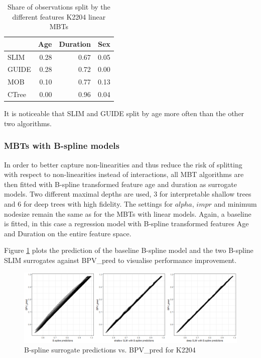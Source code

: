 \begin{table}[!htb]

\caption{Share of observations split by the different features K2204 linear MBTs}
\centering \small
\begin{tabular}[t]{l|r|r|r}
\hline
& Age & Duration & Sex\\
\hline
SLIM & 0.28 & 0.67 & 0.05\\
GUIDE & 0.28 & 0.72 & 0.00\\
MOB & 0.10 & 0.77 & 0.13\\
CTree & 0.00 & 0.96 & 0.04\\
\hline
\end{tabular}
\label{tab:ins_k2204_lm_surrogates_share}
\end{table}

It is noticeable that SLIM and GUIDE split by age more often than the other two algorithms.

\subsubsection{MBTs with B-spline models}

In order to better capture non-linearities and thus reduce the risk of splitting with respect to non-linearities instead of interactions, all MBT algorithms are then fitted with B-spline transformed feature age and duration as surrogate models. 
Two different maximal depths are used, 3 for interpretable shallow trees and 6 for deep trees with high fidelity. The settings for $alpha$, $impr$ and minimum nodesize remain the same as for the MBTs with linear models.  Again, a baseline is fitted, in this case a regression model with B-spline transformed features Age and Duration on the entire feature space. 

Figure \ref{fig:ins_k2204_fit} plots the prediction of the baseline B-spline model and the two B-spline SLIM surrogates against BPV\_pred to visualise performance improvement.

\begin{figure}[!htb]
    \centering    
    \includegraphics[width = 14cm]{Figures/insurance_use_case/k2204_BPV/fit.png}
    \caption{B-spline surrogate predictions vs. BPV\_pred for K2204}
    \label{fig:ins_k2204_fit}
\end{figure}


